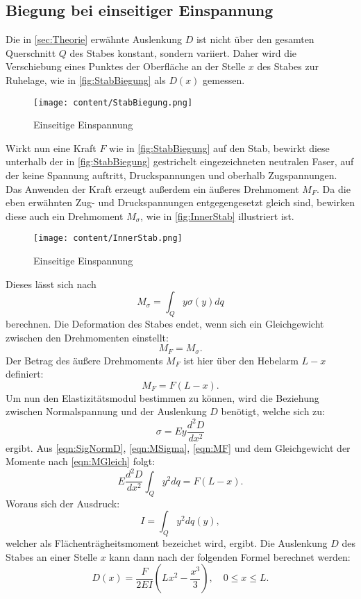 \subsection{Biegung bei einseitiger Einspannung}
\label{subsec:EinseitigeEinspannung}
Die in \autoref{sec:Theorie} erwähnte Auslenkung $D$ ist nicht über den gesamten Querschnitt $Q$ des Stabes konstant,
sondern variiert. Daher wird die Verschiebung eines Punktes der Oberfläche an der Stelle $x$ des Stabes zur Ruhelage, wie in \autoref{fig:StabBiegung}
als $D(x)$ gemessen.
\begin{figure}[H]
    \centering
    \texttt{[image: content/StabBiegung.png]}
    \caption{Einseitige Einspannung}
    \label{fig:StabBiegung}
\end{figure}
Wirkt nun eine Kraft $F$ wie in \autoref{fig:StabBiegung} auf den Stab, bewirkt diese unterhalb der in \autoref{fig:StabBiegung}
gestrichelt eingezeichneten neutralen Faser, auf der keine Spannung auftritt, Druckspannungen und oberhalb Zugspannungen.
Das Anwenden der Kraft erzeugt außerdem ein äußeres Drehmoment $M_F$. Da die eben erwähnten Zug- und Druckspannungen entgegengesetzt gleich
sind, bewirken diese auch ein Drehmoment $M_{\sigma}$, wie in \autoref{fig:InnerStab} illustriert ist.
\begin{figure}[H]
    \centering
    \texttt{[image: content/InnerStab.png]}
    \caption{Einseitige Einspannung}
    \label{fig:InnerStab}
\end{figure}
Dieses lässt sich nach
\begin{equation}
    \label{eqn:MSigma}
    M_{\sigma} = \int_Q y\sigma(y)dq
\end{equation}
berechnen. Die Deformation des Stabes endet, wenn sich ein Gleichgewicht zwischen den Drehmomenten 
einstellt:
\begin{equation}
    \label{eqn:MGleich}
    M_F = M_{\sigma}.
\end{equation}
Der Betrag des äußere Drehmoments $M_F$ ist hier über den Hebelarm $L-x$ definiert:
\begin{equation}
    \label{eqn:MF}
    M_F = F(L-x).
\end{equation}
Um nun den Elastizitätsmodul bestimmen zu können, wird die Beziehung zwischen Normalspannung und der Auslenkung $D$ benötigt,
welche sich zu:
\begin{equation}
    \label{eqn:SigNormD}
    \sigma = Ey\frac{d^2D}{dx^2}
\end{equation}
ergibt. Aus \eqref{eqn:SigNormD}, \eqref{eqn:MSigma}, \eqref{eqn:MF} und dem Gleichgewicht der Momente nach \eqref{eqn:MGleich} folgt:
\begin{equation}
    E\frac{d^2D}{dx^2} \int_Q y^2dq = F(L-x).
\end{equation}
Woraus sich der Ausdruck:
\begin{equation}
    I = \int_Q y^2dq(y),
\end{equation}
welcher als Flächenträgheitsmoment bezeichet wird, ergibt.
Die Auslenkung $D$ des Stabes an einer Stelle $x$ kann dann nach der folgenden Formel berechnet werden:
\begin{equation}
    \label{eqn:DvonX}
    D\left(x\right) = \frac{F}{2EI}\left(Lx^2-\frac{x^3}{3}\right),\quad 0\leq x \leq L.
\end{equation}
